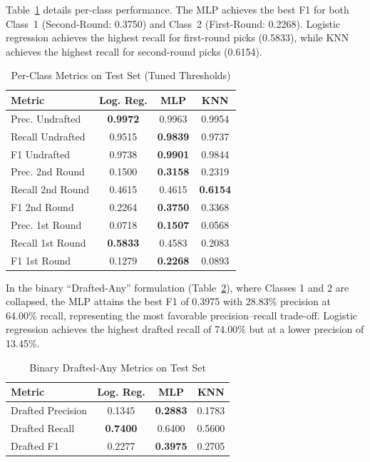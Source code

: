 Table~\ref{tab:perclass} details per-class performance. The MLP achieves the best F1 for both Class~1 (Second-Round: 0.3750) and Class~2 (First-Round: 0.2268). Logistic regression achieves the highest recall for first-round picks (0.5833), while KNN achieves the highest recall for second-round picks (0.6154).

\begin{table}[h]
\caption{Per-Class Metrics on Test Set (Tuned Thresholds)}
\label{tab:perclass}
\centering
\small
\begin{tabular}{|l|c|c|c|}
\hline
\textbf{Metric} & \textbf{Log. Reg.} & \textbf{MLP} & \textbf{KNN} \\
\hline
Prec. Undrafted & \textbf{0.9972} & 0.9963 & 0.9954 \\
Recall Undrafted & 0.9515 & \textbf{0.9839} & 0.9737 \\
F1 Undrafted & 0.9738 & \textbf{0.9901} & 0.9844 \\
\hline
Prec. 2nd Round & 0.1500 & \textbf{0.3158} & 0.2319 \\
Recall 2nd Round & 0.4615 & 0.4615 & \textbf{0.6154} \\
F1 2nd Round & 0.2264 & \textbf{0.3750} & 0.3368 \\
\hline
Prec. 1st Round & 0.0718 & \textbf{0.1507} & 0.0568 \\
Recall 1st Round & \textbf{0.5833} & 0.4583 & 0.2083 \\
F1 1st Round & 0.1279 & \textbf{0.2268} & 0.0893 \\
\hline
\end{tabular}
\end{table}

In the binary ``Drafted-Any'' formulation (Table~\ref{tab:binary}), where Classes 1 and 2 are collapsed, the MLP attains the best F1 of 0.3975 with 28.83\% precision at 64.00\% recall, representing the most favorable precision--recall trade-off. Logistic regression achieves the highest drafted recall of 74.00\% but at a lower precision of 13.45\%.

\begin{table}[h]
\caption{Binary Drafted-Any Metrics on Test Set}
\label{tab:binary}
\centering
\begin{tabular}{|l|c|c|c|}
\hline
\textbf{Metric} & \textbf{Log. Reg.} & \textbf{MLP} & \textbf{KNN} \\
\hline
Drafted Precision & 0.1345 & \textbf{0.2883} & 0.1783 \\
\hline
Drafted Recall & \textbf{0.7400} & 0.6400 & 0.5600 \\
\hline
Drafted F1 & 0.2277 & \textbf{0.3975} & 0.2705 \\
\hline
\end{tabular}
\end{table}

